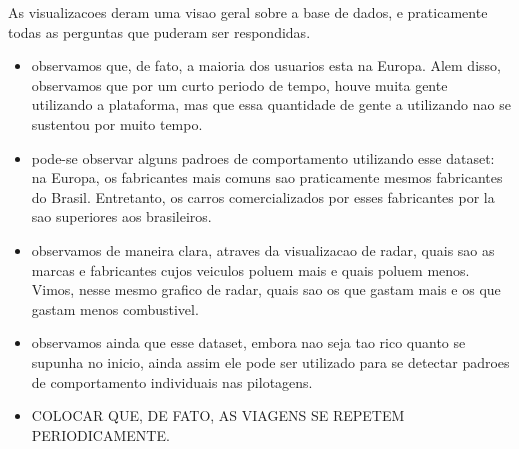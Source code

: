 \documentclass[10pt, conference]{IEEEtran}
\begin{document}
As visualizacoes deram uma visao geral sobre a base de dados, e praticamente todas
as perguntas que puderam ser respondidas. 

\begin{itemize}
  
  \item observamos que, de fato, a maioria dos usuarios esta na Europa. Alem disso, observamos
    que por um curto periodo de tempo, houve muita gente utilizando a plataforma, mas que essa
    quantidade de gente a utilizando nao se sustentou por muito tempo.

  \item pode-se observar alguns padroes de comportamento utilizando esse dataset: na Europa, os
    fabricantes mais comuns sao praticamente mesmos fabricantes do Brasil. Entretanto, os carros
    comercializados por esses fabricantes por la sao superiores aos brasileiros.

  \item observamos de maneira clara, atraves da visualizacao de radar, quais sao as marcas
  e fabricantes cujos veiculos poluem mais e quais poluem menos. Vimos, nesse mesmo grafico de radar,  
  quais sao os que gastam mais e os que gastam menos combustivel.

  \item observamos ainda que esse dataset, embora nao seja tao rico quanto se supunha no inicio,
    ainda assim ele pode ser utilizado para se detectar padroes de comportamento individuais 
    nas pilotagens.

  \item COLOCAR QUE, DE FATO, AS VIAGENS SE REPETEM PERIODICAMENTE.

\end{itemize}



%


%
\end{document}
